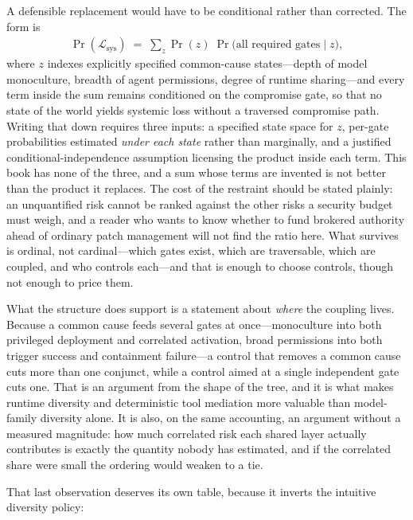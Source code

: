 A defensible replacement would have to be conditional rather than corrected. The form is
\begin{align*}
\Pr(\mathcal{L}_{\mathrm{sys}}) \;=\; \sum_{z} \Pr(z)\;\Pr\bigl(\text{all required gates} \mid z\bigr),
\end{align*}
where $z$ indexes explicitly specified common-cause states---depth of model monoculture, breadth of agent permissions, degree of runtime sharing---and every term inside the sum remains conditioned on the compromise gate, so that no state of the world yields systemic loss without a traversed compromise path. Writing that down requires three inputs: a specified state space for $z$, per-gate probabilities estimated \emph{under each state} rather than marginally, and a justified conditional-independence assumption licensing the product inside each term. This book has none of the three, and a sum whose terms are invented is not better than the product it replaces. The cost of the restraint should be stated plainly: an unquantified risk cannot be ranked against the other risks a security budget must weigh, and a reader who wants to know whether to fund brokered authority ahead of ordinary patch management will not find the ratio here. What survives is ordinal, not cardinal---which gates exist, which are traversable, which are coupled, and who controls each---and that is enough to choose controls, though not enough to price them.

What the structure does support is a statement about \emph{where} the coupling lives. Because a common cause feeds several gates at once---monoculture into both privileged deployment and correlated activation, broad permissions into both trigger success and containment failure---a control that removes a common cause cuts more than one conjunct, while a control aimed at a single independent gate cuts one. That is an argument from the shape of the tree, and it is what makes runtime diversity and deterministic tool mediation more valuable than model-family diversity alone. It is also, on the same accounting, an argument without a measured magnitude: how much correlated risk each shared layer actually contributes is exactly the quantity nobody has estimated, and if the correlated share were small the ordering would weaken to a tie.

That last observation deserves its own table, because it inverts the intuitive diversity policy:

